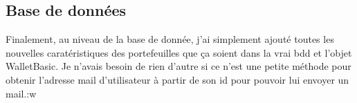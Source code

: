 \subsection{Base de données}

\begin{flushleft}
Finalement, au niveau de la base de donnée, j'ai simplement ajouté toutes les nouvelles caratéristiques des portefeuilles que ça soient dans la vrai bdd et l'objet WalletBasic. Je n'avais besoin de rien d'autre si ce n'est une petite méthode pour obtenir l'adresse mail d'utilisateur à partir de son id pour pouvoir lui envoyer un mail.:w
\end{flushleft}

